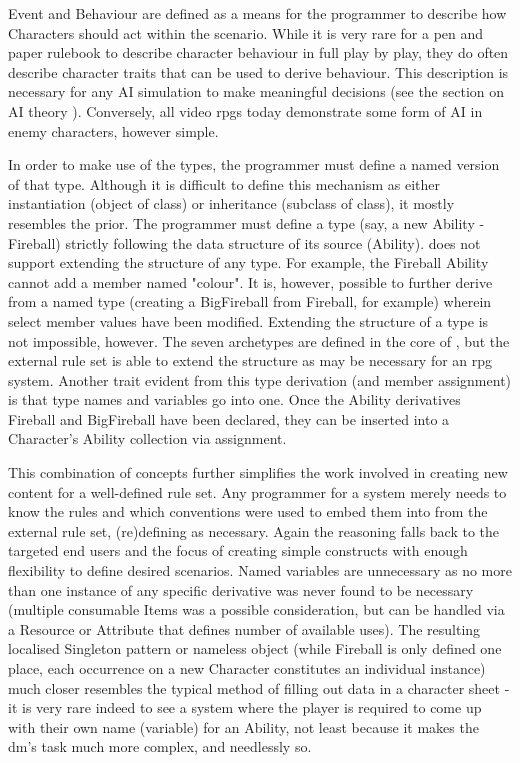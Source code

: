 Event and Behaviour are defined as a means for the programmer to describe how Characters should act within the scenario. While it is very rare for a pen and paper rulebook to describe character behaviour in full play by play, they do often describe character traits that can be used to derive behaviour. This description is necessary for any AI simulation to make meaningful decisions (see the section on AI theory ). Conversely, all video \ac{rpg}s today demonstrate some form of AI in enemy characters, however simple.

In order to make use of the types, the programmer must define a named version of that type. Although it is difficult to define this mechanism as either instantiation (object of class) or inheritance (subclass of class), it mostly resembles the prior. The programmer must define a type (say, a new Ability - Fireball) strictly following the data structure of its source (Ability). \langname{} does not support extending the structure of any type. For example, the Fireball Ability cannot add a member named "colour". It is, however, possible to further derive from a named type (creating a BigFireball from Fireball, for example) wherein select member values have been modified. Extending the structure of a type is not impossible, however. The seven archetypes are defined in the core of \langname{}, but the external rule set is able to extend the structure as may be necessary for an \ac{rpg} system. Another trait evident from this type derivation (and member assignment) is that type names and variables go into one. Once the Ability derivatives Fireball and BigFireball have been declared, they can be inserted into a Character's Ability collection via assignment.

This combination of concepts further simplifies the work involved in creating new content for a well-defined rule set. Any \langname{} programmer for a system merely needs to know the rules and which conventions were used to embed them into \langname{} from the external rule set, (re)defining as necessary. Again the reasoning falls back to the targeted end users and the focus of creating simple constructs with enough flexibility to define desired scenarios. Named variables are unnecessary as no more than one instance of any specific derivative was never found to be necessary (multiple consumable Items was a possible consideration, but can be handled via a Resource or Attribute that defines number of available uses). The resulting localised Singleton pattern or nameless object (while Fireball is only defined one place, each occurrence on a new Character constitutes an individual instance) much closer resembles the typical method of filling out data in a character sheet - it is very rare indeed to see a system where the player is required to come up with their own name (variable) for an Ability, not least because it makes the \ac{dm}'s task much more complex, and needlessly so.
